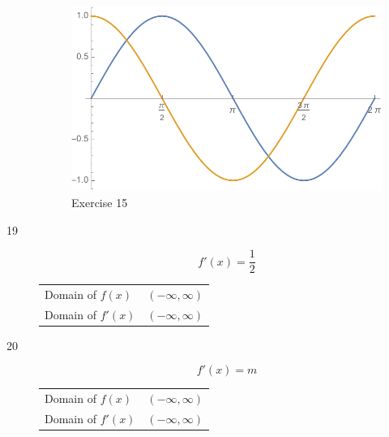 \documentclass[letterpaper, landscape]{exam}
\begin{document}
\begin{description}
        \begin{figure}[H]
          \centering
          \includegraphics[scale = 0.5]{ex14.pdf}
          \caption{Exercise 15}
          \label{fig:ex14}
        \end{figure}

      \item[19]

        \[
          f'(x) = \frac{1}{2}
        \]
        \begin{tabular}[H]{lr}
          \toprule
          Domain of $f(x)$  & $(-\infty, \infty)$ \\
          Domain of $f'(x)$ & $(-\infty, \infty)$ \\
          \bottomrule
        \end{tabular}


      \item[20]
        \[
          f'(x) = m
        \]
        \begin{tabular}[H]{lr}
          \toprule
          Domain of $f(x)$  & $(-\infty, \infty)$ \\
          Domain of $f'(x)$ & $(-\infty, \infty)$ \\
          \bottomrule
        \end{tabular}


\end{description}
\end{document}
